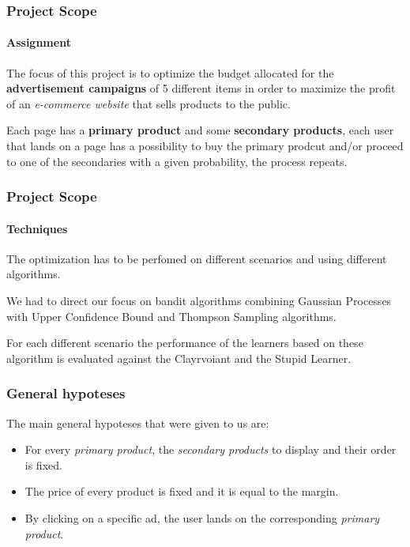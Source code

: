 
\begin{frame}

\frametitle{Project Scope}
\framesubtitle{Assignment}

The focus of this project is to optimize the budget allocated for the \textbf{advertisement campaigns} of 5 different items in order to maximize the profit of an \textit{e-commerce website} that sells products to the public.

Each page has a \textbf{primary product} and some \textbf{secondary products}, each user that lands on a page has a possibility to buy the primary prodcut and/or proceed to one of the secondaries with a given probability, the process repeats.

\end{frame}



\begin{frame}

\frametitle{Project Scope}
\framesubtitle{Techniques}

The optimization has to be perfomed on different scenarios and using different algorithms.

We had to direct our focus on bandit algorithms combining Gaussian Processes with Upper Confidence Bound and Thompson Sampling algorithms.

For each different scenario the performance of the learners based on these algorithm is evaluated against the Clayrvoiant and the Stupid Learner.

\end{frame}


\begin{frame}

\frametitle{General hypoteses}

The main general hypoteses that were given to us are:
\begin{itemize}[label={-}]
    \item For every \textit{primary product}, the \textit{secondary products} to display and their order is fixed.
    \item The price of every product is fixed and it is equal to the margin.
    \item By clicking on a specific ad, the user lands on the corresponding \textit{primary product}.
\end{itemize}

\end{frame}

